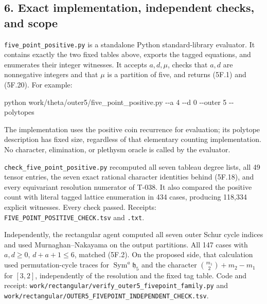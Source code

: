 \documentclass[
  10pt,
]{article}
\newenvironment{Shaded}{}{}
\newcommand{\NormalTok}[1]{#1}
\begin{document}
\subsection{6. Exact implementation, independent checks, and
scope}\label{exact-implementation-independent-checks-and-scope}

\texttt{\small five\_\allowbreak{}point\_\allowbreak{}positive.py} is a
standalone Python standard-library evaluator. It contains exactly the
two fixed tables above, exports the tagged equations, and enumerates
their integer witnesses. It accepts \(a,d,\mu\), checks that \(a,d\) are
nonnegative integers and that \(\mu\) is a partition of five, and
returns (5F.1) and (5F.20). For example:

\begin{Shaded}
\begin{Highlighting}[]
\NormalTok{python work/theta/outer5/five\_point\_positive.py {-}{-}a 4 {-}{-}d 0 {-}{-}outer 5 {-}{-}polytopes}
\end{Highlighting}
\end{Shaded}

The implementation uses the positive coin recurrence for evaluation; its
polytope description has fixed size, regardless of that elementary
counting implementation. No character, elimination, or plethysm oracle
is called by the evaluator.

\texttt{\small check\_\allowbreak{}five\_\allowbreak{}point\_\allowbreak{}positive.py}
recomputed all seven tableau degree lists, all 49 tensor entries, the
seven exact rational character identities behind (5F.18), and every
equivariant resolution numerator of T-038. It also compared the positive
count with literal tagged lattice enumeration in 434 cases, producing
118,334 explicit witnesses. Every check passed. Receipts:
\texttt{\small FIVE\_\allowbreak{}POINT\_\allowbreak{}POSITIVE\_\allowbreak{}CHECK.tsv}
and \texttt{\small .txt}.

Independently, the rectangular agent computed all seven outer Schur
cycle indices and used Murnaghan--Nakayama on the output partitions. All
147 cases with \(a,d\ge0\), \(d+a+1\le6\), matched (5F.2). On the
proposed side, that calculation used permutation-cycle traces for
\(\operatorname{Sym}^a\mathfrak h_5\) and the character
\(\binom{m_1}{2}+m_2-m_1\) for \([3,2]\), independently of the
resolution and the fixed tag table. Code and receipt:
\texttt{\small work/\allowbreak{}rectangular/\allowbreak{}verify\_\allowbreak{}outer5\_\allowbreak{}fivepoint\_\allowbreak{}family.py}
and
\texttt{\small work/\allowbreak{}rectangular/\allowbreak{}OUTER5\_\allowbreak{}FIVEPOINT\_\allowbreak{}INDEPENDENT\_\allowbreak{}CHECK.tsv}.
\end{document}
